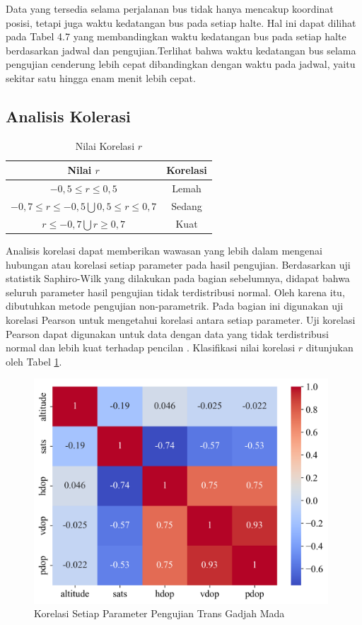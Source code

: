 Data yang tersedia selama perjalanan bus tidak hanya mencakup koordinat posisi, tetapi juga waktu kedatangan bus pada setiap halte. Hal ini dapat dilihat pada Tabel 4.7 yang membandingkan waktu kedatangan bus pada setiap halte berdasarkan jadwal dan pengujian.Terlihat bahwa waktu kedatangan bus selama pengujian cenderung lebih cepat dibandingkan dengan waktu pada jadwal, yaitu sekitar satu hingga enam menit lebih cepat.

\subsection{Analisis Kolerasi}
\begin{table}[H]
	\caption{Nilai Korelasi $r$ \cite{Carlton2012}}
	\vspace{0.5em}
	\centering
	\begin{tabular}{cc}
		\hline
		\textbf{Nilai $r$} & \textbf{Korelasi}\\
		\hline 
		$-0,5 \leq r \leq 0,5$ & Lemah \\ 
		$ -0,7 \le r \le -0,5 \bigcup 0,5 \le r \le 0,7$ & Sedang \\
		$r \leq -0,7 \bigcup r \geq 0,7$ & Kuat \\
		\hline
	\end{tabular}
	\label{Tab: korelasi-table}
\end{table}

Analisis korelasi dapat memberikan wawasan yang lebih dalam mengenai hubungan atau korelasi setiap parameter pada hasil pengujian. Berdasarkan uji statistik Saphiro-Wilk yang dilakukan pada bagian sebelumnya, didapat bahwa seluruh parameter hasil pengujian tidak terdistribusi normal. Oleh karena itu, dibutuhkan metode pengujian non-parametrik. Pada bagian ini digunakan uji korelasi Pearson untuk mengetahui korelasi antara setiap parameter. Uji korelasi Pearson dapat digunakan untuk data dengan data yang tidak terdistribusi normal dan lebih kuat terhadap pencilan \cite{Schober2018}. Klasifikasi nilai korelasi $r$ ditunjukan oleh Tabel \ref{Tab: korelasi-table}.

\begin{figure}[H]
	\centering
	\includegraphics[width=11cm]{contents/chapter-4/pengujian-bergerak/corr.png}
	\caption{Korelasi Setiap Parameter Pengujian Trans Gadjah Mada}
	\label{Fig: moving-corr}
\end{figure}

